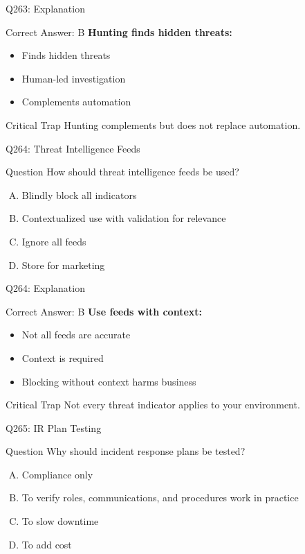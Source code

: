 \documentclass{beamer}
\begin{document}
	\begin{frame}{Q263: Explanation}
		\begin{block}{Correct Answer: B}
			\textbf{Hunting finds hidden threats:}
			\begin{itemize}
				\item Finds hidden threats
				\item Human-led investigation
				\item Complements automation
			\end{itemize}
		\end{block}
		\begin{alertblock}{Critical Trap}
			Hunting complements but does not replace automation.
		\end{alertblock}
	\end{frame}
	
	\begin{frame}{Q264: Threat Intelligence Feeds}
		\begin{block}{Question}
			How should threat intelligence feeds be used?
		\end{block}
		\begin{enumerate}[(A)]
			\item Blindly block all indicators
			\item Contextualized use with validation for relevance
			\item Ignore all feeds
			\item Store for marketing
		\end{enumerate}
	\end{frame}
	
	\begin{frame}{Q264: Explanation}
		\begin{block}{Correct Answer: B}
			\textbf{Use feeds with context:}
			\begin{itemize}
				\item Not all feeds are accurate
				\item Context is required
				\item Blocking without context harms business
			\end{itemize}
		\end{block}
		\begin{alertblock}{Critical Trap}
			Not every threat indicator applies to your environment.
		\end{alertblock}
	\end{frame}
	
	\begin{frame}{Q265: IR Plan Testing}
		\begin{block}{Question}
			Why should incident response plans be tested?
		\end{block}
		\begin{enumerate}[(A)]
			\item Compliance only
			\item To verify roles, communications, and procedures work in practice
			\item To slow downtime
			\item To add cost
		\end{enumerate}
	\end{frame}
	
\end{document}

